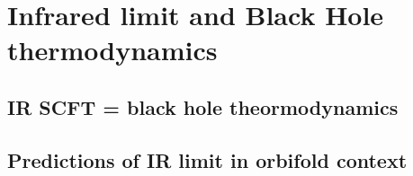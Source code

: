
\chapter{Infrared limit and Black Hole thermodynamics}
\label{infrared}
\pagestyle{fancy}

\section{IR SCFT = black hole theormodynamics}

\section{Predictions of IR limit in orbifold context}